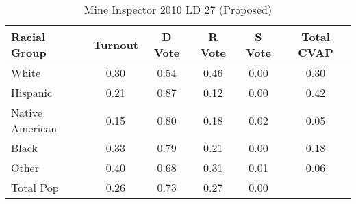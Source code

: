 \begin{table}[htb]
\begin{center}
\caption{Mine Inspector 2010 LD 27 (Proposed)}
\label{smine_cvap_ld_27}
\begin{tabular}{lccccc}
  \hline
Racial Group & Turnout & D Vote & R Vote & S Vote & Total CVAP \\ 
  \hline
White & 0.30 & 0.54 & 0.46 & 0.00 & 0.30 \\ 
  Hispanic & 0.21 & 0.87 & 0.12 & 0.00 & 0.42 \\ 
  Native American & 0.15 & 0.80 & 0.18 & 0.02 & 0.05 \\ 
  Black & 0.33 & 0.79 & 0.21 & 0.00 & 0.18 \\ 
  Other & 0.40 & 0.68 & 0.31 & 0.01 & 0.06 \\ 
  Total Pop & 0.26 & 0.73 & 0.27 & 0.00 &  \\ 
   \hline
\end{tabular}
\end{center}
\end{table}
